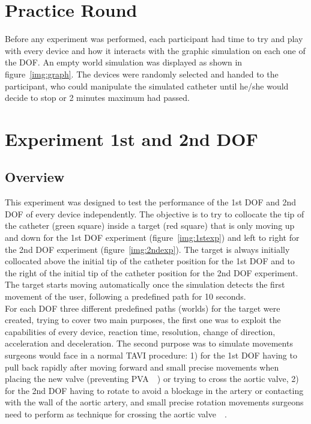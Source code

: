 \section{Practice Round}\label{sec:pratround}
Before any experiment was performed, each participant had time to try and play with every device and how it interacts with the graphic simulation on each one of the DOF. An empty world simulation was displayed as shown in figure~\ref{img:graph}. The devices were randomly selected and handed to the participant, who could manipulate the simulated catheter until he/she would decide to stop or 2 minutes maximum had passed.\\


\section{Experiment 1st and 2nd DOF}\label{sec:1stexp}
\subsection{Overview}\label{subsec:1stover}
This experiment was designed to test the performance of the 1st DOF and 2nd DOF of every device independently. The objective is to try to collocate the tip of the catheter (green square) inside a target (red square) that is only moving up and down for the 1st DOF experiment (figure~\ref{img:1stexp}) and left to right for the 2nd DOF experiment (figure~\ref{img:2ndexp}). The target is always initially collocated above the initial tip of the catheter position for the 1st DOF and to the right of the initial tip of the catheter position for the 2nd DOF experiment. The target starts moving automatically once the simulation detects the first movement of the user, following a predefined path for 10 seconds.\\

For each DOF three different predefined paths (worlds) for the target were created, trying to cover two main purposes, the first one was to exploit the capabilities of every device, reaction time, resolution, change of direction, acceleration and deceleration. The second purpose was to simulate movements surgeons would face in a normal TAVI procedure: 1) for the 1st DOF having to pull back rapidly after moving forward and small precise movements when placing the new valve (preventing PVA~\cite{pvl}~\cite{pvl2}) or trying to cross the aortic valve, 2) for the 2nd DOF having to rotate to avoid a blockage in the artery or contacting with the wall of the aortic artery, and small precise rotation movements surgeons need to perform as technique for crossing the aortic valve~\cite{raptech}~\cite{anatomic}.\\

